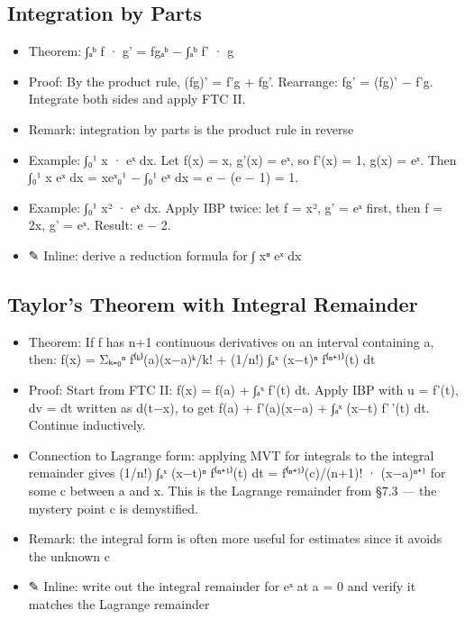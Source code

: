 \documentclass[
  10pt,
  letterpaper,
]{scrbook}
\providecommand{\tightlist}{%
  \setlength{\itemsep}{0pt}\setlength{\parskip}{0pt}}
\begin{document}
\subsection{Integration by Parts}\label{integration-by-parts}

\begin{itemize}
\tightlist
\item
  Theorem: ∫ₐᵇ f · g' = fg\textbar ₐᵇ − ∫ₐᵇ f' · g
\item
  Proof: By the product rule, (fg)' = f'g + fg'. Rearrange: fg' = (fg)'
  − f'g. Integrate both sides and apply FTC II.
\item
  Remark: integration by parts is the product rule in reverse
\item
  Example: ∫₀¹ x · eˣ dx. Let f(x) = x, g'(x) = eˣ, so f'(x) = 1, g(x) =
  eˣ. Then ∫₀¹ x eˣ dx = xeˣ\textbar₀¹ − ∫₀¹ eˣ dx = e − (e − 1) = 1.
\item
  Example: ∫₀¹ x² · eˣ dx. Apply IBP twice: let f = x², g' = eˣ first,
  then f = 2x, g' = eˣ. Result: e − 2.
\item
  ✎ Inline: derive a reduction formula for ∫ xⁿ eˣ dx
\end{itemize}

\subsection{Taylor's Theorem with Integral
Remainder}\label{taylors-theorem-with-integral-remainder}

\begin{itemize}
\tightlist
\item
  Theorem: If f has n+1 continuous derivatives on an interval containing
  a, then: f(x) = Σₖ₌₀ⁿ f⁽ᵏ⁾(a)(x−a)ᵏ/k! + (1/n!) ∫ₐˣ (x−t)ⁿ f⁽ⁿ⁺¹⁾(t)
  dt
\item
  Proof: Start from FTC II: f(x) = f(a) + ∫ₐˣ f'(t) dt. Apply IBP with u
  = f'(t), dv = dt written as d(t−x), to get f(a) + f'(a)(x−a) + ∫ₐˣ
  (x−t) f'\,'(t) dt. Continue inductively.
\item
  Connection to Lagrange form: applying MVT for integrals to the
  integral remainder gives (1/n!) ∫ₐˣ (x−t)ⁿ f⁽ⁿ⁺¹⁾(t) dt =
  f⁽ⁿ⁺¹⁾(c)/(n+1)! · (x−a)ⁿ⁺¹ for some c between a and x. This is the
  Lagrange remainder from §7.3 --- the mystery point c is demystified.
\item
  Remark: the integral form is often more useful for estimates since it
  avoids the unknown c
\item
  ✎ Inline: write out the integral remainder for eˣ at a = 0 and verify
  it matches the Lagrange remainder
\end{itemize}
\end{document}
